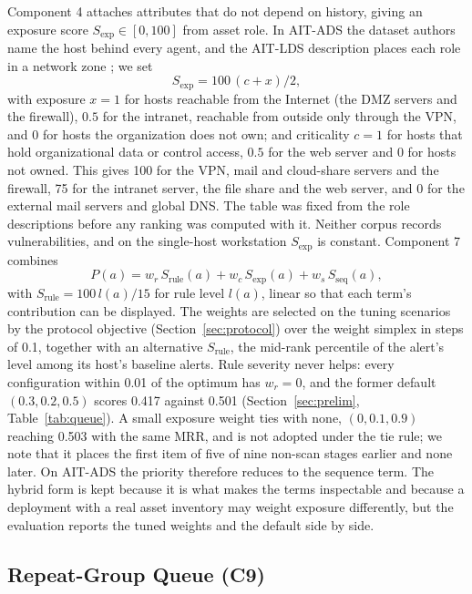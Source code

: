 \documentclass[conference]{IEEEtran}
\begin{document}
Component 4 attaches attributes that do not depend on history, giving an exposure score $S_\mathrm{exp} \in [0,100]$ from asset role. In AIT-ADS the dataset authors name the host behind every agent, and the AIT-LDS description places each role in a network zone \cite{ref22}; we set
\begin{equation}
S_\mathrm{exp} = 100\,(c + x)/2,
\end{equation}
with exposure $x = 1$ for hosts reachable from the Internet (the DMZ servers and the firewall), $0.5$ for the intranet, reachable from outside only through the VPN, and $0$ for hosts the organization does not own; and criticality $c = 1$ for hosts that hold organizational data or control access, $0.5$ for the web server and $0$ for hosts not owned. This gives 100 for the VPN, mail and cloud-share servers and the firewall, 75 for the intranet server, the file share and the web server, and 0 for the external mail servers and global DNS. The table was fixed from the role descriptions before any ranking was computed with it. Neither corpus records vulnerabilities, and on the single-host workstation $S_\mathrm{exp}$ is constant. Component 7 combines
\begin{equation}
P(a) = w_r\, S_\mathrm{rule}(a) + w_c\, S_\mathrm{exp}(a) + w_s\, S_\mathrm{seq}(a),
\end{equation}
with $S_\mathrm{rule} = 100\, l(a)/15$ for rule level $l(a)$, linear so that each term's contribution can be displayed. The weights are selected on the tuning scenarios by the protocol objective (Section~\ref{sec:protocol}) over the weight simplex in steps of 0.1, together with an alternative $S_\mathrm{rule}$, the mid-rank percentile of the alert's level among its host's baseline alerts. Rule severity never helps: every configuration within 0.01 of the optimum has $w_r = 0$, and the former default $(0.3, 0.2, 0.5)$ scores 0.417 against 0.501 (Section~\ref{sec:prelim}, Table~\ref{tab:queue}). A small exposure weight ties with none, $(0, 0.1, 0.9)$ reaching 0.503 with the same MRR, and is not adopted under the tie rule; we note that it places the first item of five of nine non-scan stages earlier and none later. On AIT-ADS the priority therefore reduces to the sequence term. The hybrid form is kept because it is what makes the terms inspectable and because a deployment with a real asset inventory may weight exposure differently, but the evaluation reports the tuned weights and the default side by side.

\subsection{Repeat-Group Queue (C9)}
\label{sec:queue}
\end{document}
